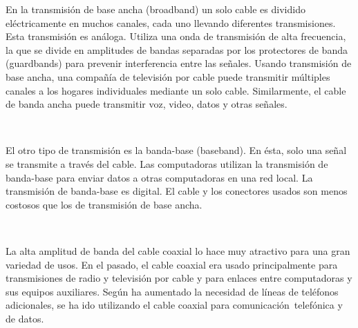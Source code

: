 \documentclass[a4paper]{article}
\begin{document}
\begin{quote}
\noindent{}
\end{quote}

En la transmisión de base ancha (broadband) un solo cable es dividido
eléctricamente en muchos canales, cada uno llevando diferentes
transmisiones. Esta transmisión es análoga. Utiliza una onda de
transmisión de alta frecuencia, la que se divide en amplitudes de bandas
separadas por los protectores de banda (guardbands) para prevenir
interferencia entre las señales. Usando transmisión de base ancha, una
compañía de televisión por cable puede transmitir múltiples canales a
los hogares individuales mediante un solo cable. Similarmente, el cable
de banda ancha puede transmitir voz, video, datos y otras señales.

~

El otro tipo de transmisión es la banda-base (baseband). En ésta, solo
una señal se transmite a través del cable. Las computadoras utilizan la
transmisión de banda-base para enviar datos a otras computadoras en una
red local. La transmisión de banda-base es digital. El cable y los
conectores usados son menos costosos que los de transmisión de base
ancha.

~

La alta amplitud de banda del cable coaxial lo hace muy atractivo para
una gran variedad de usos. En el pasado, el cable coaxial era usado
principalmente para transmisiones de radio y televisión por cable y para
enlaces entre computadoras y sus equipos auxiliares. Según ha aumentado
la necesidad de líneas de teléfonos adicionales, se ha ido utilizando el
cable coaxial para comunicación~telefónica y de datos.
\end{document}
